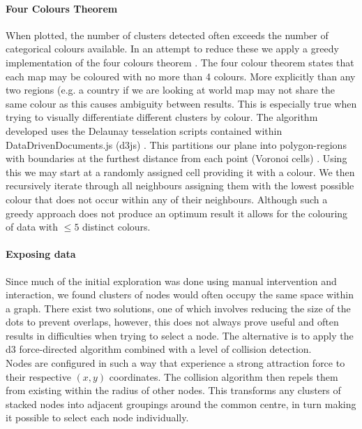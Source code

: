 \paragraph{Four Colours Theorem}
When plotted, the number of clusters detected often exceeds the number of categorical colours available. In an attempt to reduce these we apply a greedy implementation of the four colours theorem \cite{fourcolour}.
The four colour theorem states that each map may be coloured with no more than 4 colours. More explicitly than any two regions (e.g. a country if we are looking at world map may not share the same colour as this causes ambiguity between results. This is especially true when trying to visually differentiate different clusters by colour. The algorithm developed uses the Delaunay tesselation scripts contained within DataDrivenDocuments.js (d3js) \cite{d3js}. This partitions our plane into polygon-regions with boundaries at the furthest distance from each point (Voronoi cells) \cite{delaunay}. Using this we may start at a randomly assigned cell providing it with a colour. We then recursively iterate through all neighbours assigning them with the lowest possible colour that does not occur within any of their neighbours. Although such a greedy approach does not produce an optimum result it allows for the colouring of data with $\le 5$ distinct colours.



\paragraph{Exposing data}
Since much of the initial exploration was done using manual intervention and interaction, we found clusters of nodes would often occupy the same space within a graph. There exist two solutions, one of which involves reducing the size of the dots to prevent overlaps, however, this does not always prove useful and often results in difficulties when trying to select a node. The alternative is to apply the d3 force-directed algorithm combined with a level of collision detection. \\

Nodes are configured in such a way that experience a strong attraction force to their respective $(x,y)$ coordinates. The collision algorithm then repels them from existing within the radius of other nodes. This transforms any clusters of stacked nodes into adjacent groupings around the common centre, in turn making it possible to select each node individually.

